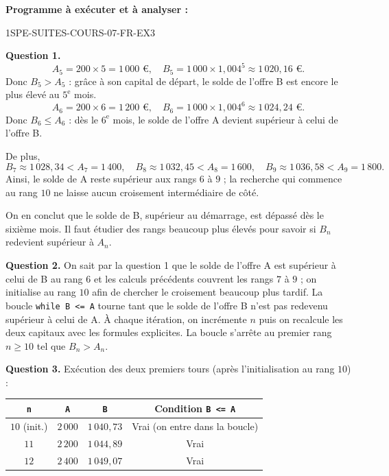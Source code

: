 \noindent\textbf{Programme à exécuter et à analyser :}



\begin{corrige}{1SPE-SUITES-COURS-07-FR-EX3}

\textbf{Question 1.}
\[
  A_5 = 200 \times 5 = 1\,000 \text{ €}, \quad B_5 = 1\,000 \times 1{,}004^5 \approx 1\,020{,}16 \text{ €.}
\]
Donc $B_5 > A_5$ : grâce à son capital de départ, le solde de l'offre B est
encore le plus élevé au $5^{\text{e}}$ mois.
\[
  A_6 = 200 \times 6 = 1\,200 \text{ €}, \quad B_6 = 1\,000 \times 1{,}004^6 \approx 1\,024{,}24 \text{ €.}
\]
Donc $B_6 \leqslant A_6$ : dès le $6^{\text{e}}$ mois, le solde de l'offre A
devient supérieur à celui de l'offre B.

De plus,
\[
B_7\approx1\,028{,}34<A_7=1\,400,\quad
B_8\approx1\,032{,}45<A_8=1\,600,\quad
B_9\approx1\,036{,}58<A_9=1\,800.
\]
Ainsi, le solde de A reste supérieur aux rangs $6$ à $9$ ; la recherche qui
commence au rang $10$ ne laisse aucun croisement intermédiaire de côté.


On en conclut que le solde de B, supérieur au démarrage, est dépassé dès le
sixième mois. Il faut étudier des rangs beaucoup plus élevés pour savoir si
$B_n$ redevient supérieur à $A_n$.

\textbf{Question 2.} On sait par la question 1 que le solde de l'offre A est
supérieur à celui de B au rang $6$ et les calculs précédents couvrent les rangs $7$ à $9$ ; on initialise
au rang $10$ afin de chercher le croisement beaucoup
plus tardif. La boucle \texttt{while B <= A} tourne tant que le solde de l'offre B
n'est pas redevenu supérieur à celui de A. À chaque itération, on incrémente $n$ puis on recalcule les
deux capitaux avec les formules explicites. La boucle s'arrête au premier rang
$n\geqslant10$ tel que $B_n>A_n$.

\textbf{Question 3.} Exécution des deux premiers tours (après l'initialisation au rang $10$) :

\begin{center}
\begin{tabular}{|c|c|c|c|}
\hline
\texttt{n} & \texttt{A} & \texttt{B} & Condition \texttt{B <= A} \\
\hline
$10$ (init.) & $2\,000$ & $1\,040{,}73$ & Vrai (on entre dans la boucle) \\
\hline
$11$ & $2\,200$ & $1\,044{,}89$ & Vrai \\
\hline
$12$ & $2\,400$ & $1\,049{,}07$ & Vrai \\
\hline
\end{tabular}
\end{center}


\end{corrige}
